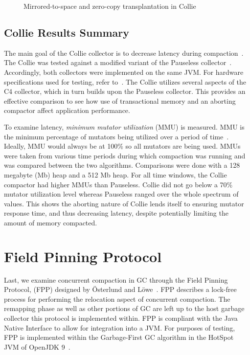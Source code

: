 \documentclass{sig-alternate}
\begin{document}
\begin{figure}
\centering
{}
\caption{Mirrored-to-space and zero-copy transplantation in Collie}
\label{fig:collieMirrored}
\end{figure}


\subsection{Collie Results Summary}
\label{sec:collieResults}


The main goal of the Collie collector is to decrease latency
during compaction~\cite{Iyengar:Collie}. The Collie was tested 
against a modified variant of the Pauseless collector~\cite{Click:Pauseless}.
Accordingly, both collectors were implemented on the same JVM. For hardware
specifications used for testing, refer to~\cite{Iyengar:Collie}. The Collie
utilizes several aspects of the C4 collector, which in turn builds upon the Pauseless
collector. This provides an effective comparison to see how 
use of transactional memory and an aborting compactor affect application performance. 

To examine latency, \emph{minimum mutator utilization} (MMU) is measured.
MMU is the minimum percentage of mutators being utilized over a period of time~\cite{Bacon:MMU}. Ideally,
MMU would always be at 100\% so all mutators are being used. 
MMUs were taken from various time periods during which
compaction was running and was compared between the two algorithms. Comparisons were done
with a 128 megabyte (Mb) heap and a 512 Mb heap. For all time windows, the Collie compactor
had higher MMUs than Pauseless. Collie did not go below a 70\% mutator utilization 
level whereas Pauseless ranged over the whole spectrum of values. 
This shows the aborting nature of Collie
lends itself to ensuring mutator response time, and thus decreasing latency, 
despite potentially limiting the amount of memory compacted.


\section{Field Pinning Protocol}
\label{sec:fpp}

Last, we examine concurrent compaction in GC through the Field Pinning
Protocol, (FPP) designed by \"{O}sterlund and L\"{o}we~\cite{Osterlund:FPP}.
FPP describes a lock-free process for performing the relocation aspect
of concurrent compaction. The remapping phase as well as other portions
of GC are left up to the host garbage collector this
protocol is implemented within. FPP is compliant with the Java Native Interface
to allow for integration into a JVM. For purposes of testing, FPP 
is implemented within the Garbage-First GC algorithm in the HotSpot JVM 
of OpenJDK 9~\cite{Detlefs:G1}.
\end{document}
